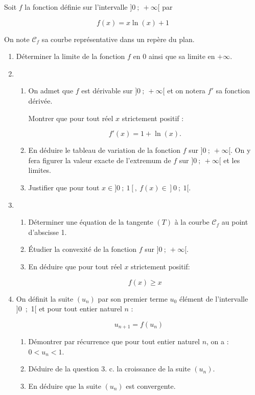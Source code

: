 \documentclass[10pt,a4paper]{article}
\begin{document}
Soit $f$ la fonction définie sur l'intervalle $]0~;~ +\infty[$ par 

\[f(x) = x\ln (x) + 1\]

On note $\mathcal{C}_f$ sa courbe représentative dans un repère du plan.

\medskip

\begin{enumerate}
\item Déterminer la limite de la fonction $f$ en $0$ ainsi que sa limite en $+\infty$.
\item 
	\begin{enumerate}
		\item On admet que $f$ est dérivable sur $]0~;~+\infty[$ et on notera $f'$ sa fonction dérivée.
		
Montrer que pour tout réel $x$ strictement positif :

\[f'(x) = 1 + \ln (x).\]

		\item En déduire le tableau de variation de la fonction $f$ sur $]0~;~ +\infty[$. On y fera figurer la valeur exacte de l'extremum de $f$ sur $]0~;~ +\infty[$ et les limites.
		\item Justifier que pour tout $x \in  ]0~;~1[,\:f(x) \in ]0~;~1[$.
	\end{enumerate}	
\item 
	\begin{enumerate}
		\item Déterminer une équation de la tangente $(T)$ à la courbe $\mathcal{C}_f$ au point d'abscisse 1.
		\item Étudier la convexité de la fonction $f$ sur $]0~;~+\infty[$.
		\item En déduire que pour tout réel $x$ strictement positif:
		
		\[f(x) \geqslant x\]
		
	\end{enumerate}
\item On définit la suite $\left(u_n\right)$ par son premier terme $u_0$ élément de l'intervalle ]0~;~1[ et pour tout entier naturel $n$ :

\[u_{n+1} = f\left(u_n\right)\]

	\begin{enumerate}
		\item Démontrer par récurrence que pour tout entier naturel $n$, on a : $0 < u_n < 1$.
		\item Déduire de la question 3. c. la croissance de la suite $\left(u_n\right)$.
		\item En déduire que la suite $\left(u_n\right)$ est convergente.
	\end{enumerate}
\end{enumerate}
\end{document}
